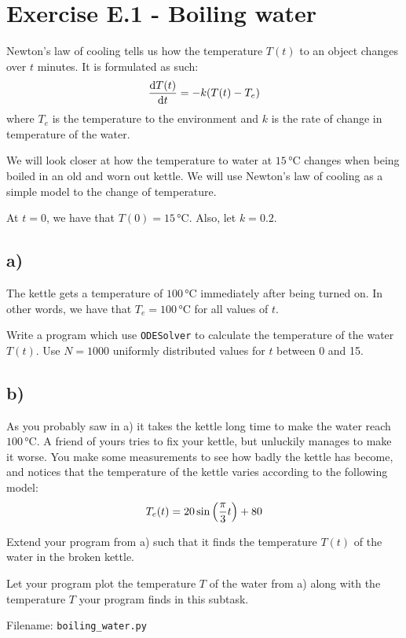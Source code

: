 \documentclass[10pt,a4paper]{article}
\begin{document}
\section*{Exercise E.1 - Boiling water}

Newton's law of cooling tells us how the temperature $T(t)$ to an object changes over $t$ minutes. 
It is formulated as such:
\[
\dv{T(t)}{t} = -k\qty(T(t) - T_e )
\]
where $T_e $ is the temperature to the environment and $k$ is the rate of change in temperature of the water. 

We will look closer at how the temperature to water at $15\,\si{\celsius}$ changes when being boiled in an old and worn out kettle. We will use Newton's law of cooling as a simple  model to the change of temperature.

At $t = 0$, we have that $T(0) = 15\,\si{\celsius}$. Also, let $k = 0.2$.

\subsection*{a)}
The kettle gets a temperature of $100\, \si{\celsius}$ immediately after being turned on. In other words, we have that  $T_e = 100\,\si{\celsius}$  for all values of $t$. 

Write a program which use \texttt{ODESolver} to calculate the temperature of the water $T(t)$. Use $N = 1000$ uniformly distributed values for $t$ between 0 and 15.
\subsection*{b)}
As you probably saw in a) it takes the kettle long time to make the water reach $100\,\si{\celsius}$. A friend of yours tries to fix your kettle, but unluckily manages to make it worse. You make some measurements to see how badly the kettle has become, and notices that the temperature of the kettle varies according to the following model:
\[
T_e(t) = 20\sin\qty(\frac{\pi}{3}t)+80
\]

Extend your program from a) such that it finds the temperature $T(t)$ of the water in the broken kettle.

Let your program plot the temperature $T$ of the water from a) along with the temperature $T$ your program finds in this subtask. 

Filename: \texttt{boiling\_water.py}
\end{document}
